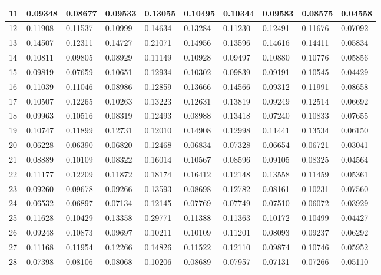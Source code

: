 \begin{table}[H]
{\begin{tabular}{|l|l|l|l|l|l|l|l|l|l|}
        11 & 0.09348 & 0.08677 & 0.09533 & 0.13055 & 0.10495 & 0.10344 & 0.09583 & 0.08575 & 0.04558 \\ \hline
        12 & 0.11908 & 0.11537 & 0.10999 & 0.14634 & 0.13284 & 0.11230 & 0.12491 & 0.11676 & 0.07092 \\ \hline
        13 & 0.14507 & 0.12311 & 0.14727 & 0.21071 & 0.14956 & 0.13596 & 0.14616 & 0.14411 & 0.05834 \\ \hline
        14 & 0.10811 & 0.09805 & 0.08929 & 0.11149 & 0.10928 & 0.09497 & 0.10880 & 0.10776 & 0.05856 \\ \hline
        15 & 0.09819 & 0.07659 & 0.10651 & 0.12934 & 0.10302 & 0.09839 & 0.09191 & 0.10545 & 0.04429 \\ \hline
        16 & 0.11039 & 0.11046 & 0.08986 & 0.12859 & 0.13666 & 0.14566 & 0.09312 & 0.11991 & 0.08658 \\ \hline
        17 & 0.10507 & 0.12265 & 0.10263 & 0.13223 & 0.12631 & 0.13819 & 0.09249 & 0.12514 & 0.06692 \\ \hline
        18 & 0.09963 & 0.10516 & 0.08319 & 0.12493 & 0.08988 & 0.13418 & 0.07240 & 0.10833 & 0.07655 \\ \hline
        19 & 0.10747 & 0.11899 & 0.12731 & 0.12010 & 0.14908 & 0.12998 & 0.11441 & 0.13534 & 0.06150 \\ \hline
        20 & 0.06228 & 0.06390 & 0.06820 & 0.12468 & 0.06834 & 0.07328 & 0.06654 & 0.06721 & 0.03041 \\ \hline
        21 & 0.08889 & 0.10109 & 0.08322 & 0.16014 & 0.10567 & 0.08596 & 0.09105 & 0.08325 & 0.04564 \\ \hline
        22 & 0.11177 & 0.12209 & 0.11872 & 0.18174 & 0.16412 & 0.12148 & 0.13558 & 0.11459 & 0.05361 \\ \hline
        23 & 0.09260 & 0.09678 & 0.09266 & 0.13593 & 0.08698 & 0.12782 & 0.08161 & 0.10231 & 0.07560 \\ \hline
        24 & 0.06532 & 0.06897 & 0.07134 & 0.12145 & 0.07769 & 0.07749 & 0.07510 & 0.06072 & 0.03929 \\ \hline
        25 & 0.11628 & 0.10429 & 0.13358 & 0.29771 & 0.11388 & 0.11363 & 0.10172 & 0.10499 & 0.04427 \\ \hline
        26 & 0.09248 & 0.10873 & 0.09697 & 0.10211 & 0.10109 & 0.11201 & 0.08093 & 0.09237 & 0.06292 \\ \hline
        27 & 0.11168 & 0.11954 & 0.12266 & 0.14826 & 0.11522 & 0.12110 & 0.09874 & 0.10746 & 0.05952 \\ \hline
        28 & 0.07398 & 0.08106 & 0.08068 & 0.10206 & 0.08689 & 0.07957 & 0.07131 & 0.07266 & 0.05110 \\ \hline

\end{tabular}}
\end{table}
